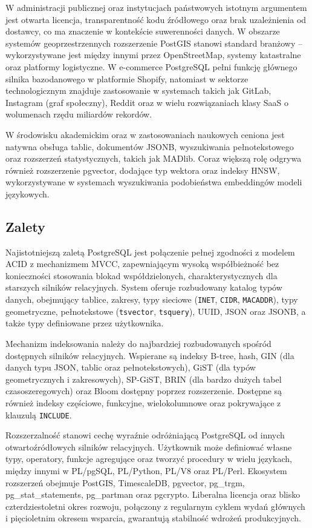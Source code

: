 W administracji publicznej oraz instytucjach państwowych istotnym argumentem
jest otwarta licencja, transparentność kodu źródłowego oraz brak uzależnienia
od dostawcy, co ma znaczenie w kontekście suwerenności danych. W obszarze
systemów geoprzestrzennych rozszerzenie PostGIS stanowi standard branżowy --
wykorzystywane jest między innymi przez OpenStreetMap, systemy katastralne
oraz platformy logistyczne. W e-commerce PostgreSQL pełni funkcję głównego
silnika bazodanowego w platformie Shopify, natomiast w sektorze technologicznym
znajduje zastosowanie w systemach takich jak GitLab, Instagram (graf społeczny),
Reddit oraz w wielu rozwiązaniach klasy SaaS o wolumenach rzędu miliardów rekordów.

W środowisku akademickim oraz w zastosowaniach naukowych ceniona jest natywna
obsługa tablic, dokumentów JSONB, wyszukiwania pełnotekstowego oraz rozszerzeń
statystycznych, takich jak MADlib. Coraz większą rolę odgrywa również rozszerzenie
pgvector, dodające typ wektora oraz indeksy HNSW, wykorzystywane w systemach
wyszukiwania podobieństwa embeddingów modeli językowych.

\subsection{Zalety}

Najistotniejszą zaletą PostgreSQL jest połączenie pełnej zgodności z modelem
ACID z mechanizmem MVCC, zapewniającym wysoką współbieżność bez konieczności
stosowania blokad współdzielonych, charakterystycznych dla starszych silników
relacyjnych. System oferuje rozbudowany katalog typów danych, obejmujący
tablice, zakresy, typy sieciowe (\texttt{INET}, \texttt{CIDR}, \texttt{MACADDR}),
typy geometryczne, pełnotekstowe (\texttt{tsvector}, \texttt{tsquery}), UUID,
JSON oraz JSONB, a także typy definiowane przez użytkownika.

Mechanizm indeksowania należy do najbardziej rozbudowanych spośród dostępnych
silników relacyjnych. Wspierane są indeksy B-tree, hash, GIN (dla danych typu
JSON, tablic oraz pełnotekstowych), GiST (dla typów geometrycznych i zakresowych),
SP-GiST, BRIN (dla bardzo dużych tabel czasoszeregowych) oraz Bloom dostępny
poprzez rozszerzenie. Dostępne są również indeksy częściowe, funkcyjne,
wielokolumnowe oraz pokrywające z klauzulą \texttt{INCLUDE}.

Rozszerzalność stanowi cechę wyraźnie odróżniającą PostgreSQL od innych
otwartoźródłowych silników relacyjnych. Użytkownik może definiować własne
typy, operatory, funkcje agregujące oraz tworzyć procedury w wielu językach,
między innymi w PL/pgSQL, PL/Python, PL/V8 oraz PL/Perl. Ekosystem rozszerzeń
obejmuje PostGIS, TimescaleDB, pgvector, pg\_trgm, pg\_stat\_statements,
pg\_partman oraz pgcrypto. Liberalna licencja oraz blisko czterdziestoletni
okres rozwoju, połączony z regularnym cyklem wydań głównych i pięcioletnim
okresem wsparcia, gwarantują stabilność wdrożeń produkcyjnych.

